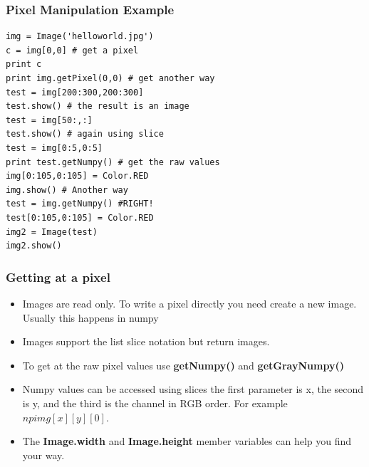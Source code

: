 \documentclass{beamer}
\begin{document}
\begin{frame}[fragile] 
\frametitle{Pixel Manipulation Example}
\begin{example}
\begin{verbatim}
img = Image('helloworld.jpg')
c = img[0,0] # get a pixel
print c
print img.getPixel(0,0) # get another way
test = img[200:300,200:300]
test.show() # the result is an image
test = img[50:,:]
test.show() # again using slice
test = img[0:5,0:5]
print test.getNumpy() # get the raw values
img[0:105,0:105] = Color.RED 
img.show() # Another way
test = img.getNumpy() #RIGHT!
test[0:105,0:105] = Color.RED
img2 = Image(test)
img2.show()
\end{verbatim}
\end{example}
\end{frame}
\begin{frame}
\frametitle{Getting at a pixel}
\begin{itemize}
\item Images are read only. To write a pixel directly you need create a new
  image. Usually this happens in numpy
\item Images support the list slice notation but return images.
\item To get at the raw pixel values use \textbf{getNumpy()} and \textbf{getGrayNumpy()} 
\item Numpy values can be accessed using slices the first parameter is
  x, the second is y,  and the third is the channel in RGB order. For
  example $npimg[x][y][0]$. 
\item The \textbf{Image.width} and \textbf{Image.height} member
  variables can help you find your way. 
\end{itemize}
\end{frame}
\end{document}

